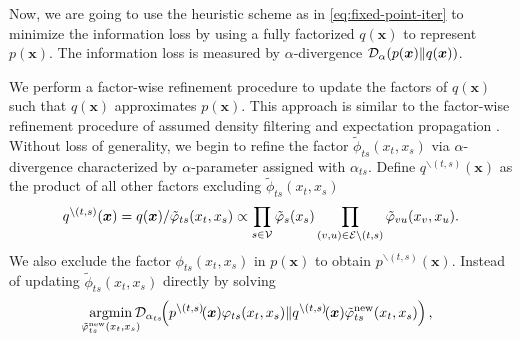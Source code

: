 Now, we are going to use the heuristic scheme as in \eqref{eq:fixed-point-iter} to minimize the information loss by using a fully factorized $q(\bm{x})$ to represent $p(\bm{x})$. The information loss is measured by $\alpha$-divergence $\mathcal{D}_{\alpha}(p(\bm{x}) \| q(\bm{x}))$.


We perform a factor-wise refinement procedure to update the factors of $q(\bm{x})$ such that $q(\bm{x})$ approximates $p(\bm{x})$. This approach is similar to the factor-wise refinement procedure of assumed density filtering\cite{ghosh2016assumed, opper1999bayesian} and expectation propagation \cite{divergence-measures-and-message-passing,Minka:2001:EPA:647235.720257}. Without loss of generality, we begin to refine the factor $\tilde{\phi}_{ts}(x_t, x_s)$ via $\alpha$-divergence characterized by $\alpha$-parameter assigned with $\alpha_{ts}$. Define $q^{\backslash (t,s)}(\bm{x})$ as the product of all other factors excluding $\tilde{\phi}_{ts}(x_t, x_s)$
\begin{align}
  q^{\backslash (t,s)}(\bm{x})
  = q(\bm{x})/\tilde{\varphi}_{ts}(x_t,
    x_s) \propto \prod_{{s\in \mathcal{V}}} \tilde{\varphi}_s(x_s) \prod_{(v,u) \in
    \mathcal{E}\backslash (t,s)}
    \tilde{\varphi}_{vu}(x_v, x_u).
\end{align}
We also exclude the factor $\phi_{ts}(x_t, x_s)$ in $p(\bm{x})$ to obtain $p^{\backslash (t,s)}(\bm{x})$. %
Instead of updating $\tilde{\phi}_{ts}(x_t, x_s)$ directly by solving
\begin{equation}
  \!\!\!\uargmin{\tilde{\phi}_{ts}^{\mathrm{new}}(x_t, x_s)}\!\!\!\! \Dd_{\alpha_{ts}}\!\!\left(  p^{\backslash (t,s)}\!(\bm{x})\phi_{ts}(x_t, x_s)\|q^{\backslash (t,s)}\!(\bm{x})\tilde{\phi}_{ts}^{\mathrm{new}}(x_t, x_s)\right),
\end{equation}
